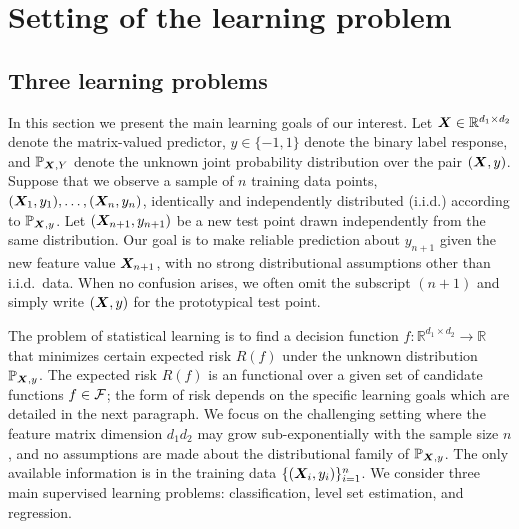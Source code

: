 \documentclass[mathptm]{statsoc}
\begin{document}
\section{Setting of the learning problem}
\subsection{Three learning problems}
In this section we present the main learning goals of our interest. Let $\bm X\in\mathbb{R}^{d_1\times d_2}$ denote the matrix-valued predictor, $y\in\{-1,1\}$ denote the binary label response, and $\mathbb{P}_{\bm X,Y}$ denote the unknown joint probability distribution over the pair $(\bm X,y)$. Suppose that we observe a sample of $n$ training data points, $(\bm X_1,y_1),\ldots,(\bm X_n,y_n)$, identically and independently distributed (i.i.d.) according to $\mathbb{P}_{\bm X,y}$. Let $(\bm X_{n+1},y_{n+1})$ be a new test point drawn independently from the same distribution. Our goal is to make reliable prediction about $y_{n+1}$ given the new feature value $\bm X_{n+1}$, with no strong distributional assumptions other than i.i.d.\ data. When no confusion arises, we often omit the subscript $(n+1)$ and simply write $(\bm X,y)$ for the prototypical test point. 

 
The problem of statistical learning is to find a decision function $f\colon \mathbb{R}^{d_1\times d_2}\to \mathbb{R}$ that minimizes certain expected risk $R(f)$ under the unknown distribution $\mathbb{P}_{\bm X,y}$. The expected risk $R(f)$ is an functional over a given set of candidate functions $f\in \mathcal{F}$; the form of risk depends on the specific learning goals which are detailed in the next paragraph. We focus on the challenging setting where the feature matrix dimension $d_1d_2$ may grow sub-exponentially with the sample size $n$, and no assumptions are made about the distributional family of $\mathbb{P}_{\bm X,y}$. The only available information is in the training data $\{(\bm X_i,y_i)\}_{i=1}^n$. We consider three main supervised learning problems: classification, level set estimation, and regression. 
\end{document}
